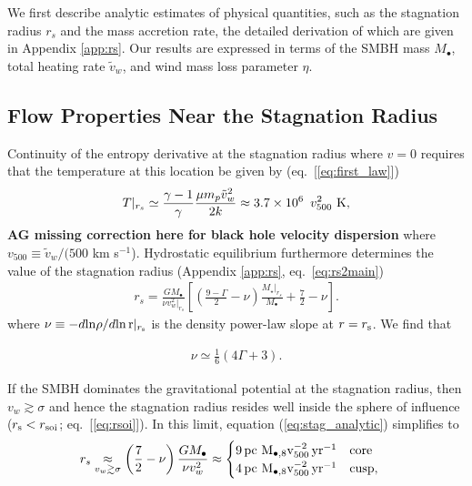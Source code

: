 \documentclass[usenatbib,fleqn]{mn2e}
\newcommand{\rs}{r_s}
\newcommand{\pc}{\rm pc}
\newcommand{\Mstar}{M_{\star}}
\newcommand{\Mbh}[1][]{M_{\bullet#1}}
\newcommand{\Mbheight}{M_{\bullet,8}}
\newcommand{\pyear}{{\rm yr}^{-1}}
\newcommand{\densSlope}{\nu}
\begin{document}
We first describe analytic estimates of physical quantities, such as the stagnation radius $\rs$ and the mass accretion rate, the detailed derivation of which are given in Appendix \ref{app:rs}.  Our results are expressed in terms of the SMBH mass $M_{\bullet}$, total heating rate $\tilde{v}_{w}$, and wind mass loss parameter $\eta$.

\subsection{Flow Properties Near the Stagnation Radius}

Continuity of the entropy derivative at the stagnation radius where $v = 0$ requires that the temperature at this location be given by (eq.~[\ref{eq:first_law}])
\begin{align}
T|_{r_{s}} \simeq \frac{\gamma-1}{\gamma}\frac{\mu m_p \tilde{v}_{w}^{2}}{2k} \approx 3.7
\times 10^6\ \, v_{500}^2 \,\,{\rm K},
\label{eq:Tanalytic}
\end{align}
{\bf AG missing correction here for black hole velocity dispersion}
where $v_{500} \equiv \tilde{v}_{w}/(500$ km s$^{-1}$).  Hydrostatic equilibrium furthermore determines the value of the stagnation radius (Appendix \ref{app:rs}, eq.~\ref{eq:rs2main})
\begin{align}
  \rs=\frac{G \Mbh}{\densSlope
    v_w^{2}|_{\rs}}\left[\left(\frac{9-\Gamma}{2} -\densSlope\right)
    \frac{\Mstar|_{\rs}}{\Mbh} +\frac{7}{2}-\densSlope\right].
\label{eq:stag_analytic}
\end{align}
where $\densSlope \equiv -d{\rm ln}\rho/d{\rm ln\,r}|_{r_{\rm s}}$ is the
density power-law slope at $r = r_{\rm s}$. We find that 

\begin{align}
\densSlope \simeq \frac{1}{6} \left(4 \Gamma+3\right).
\label{eq:densSlope}
\end{align}

If the SMBH dominates the gravitational potential at the stagnation
radius, then $v_{w} \gtrsim \sigma$ and hence the stagnation radius
resides well inside the sphere of influence ($r_{\rm s} < r_{\rm
  soi}$; eq.~[\ref{eq:rsoi}]).  In this limit, equation
(\ref{eq:stag_analytic}) simplifies to
\begin{eqnarray}
  &\rs \underset{v_w \gtrsim \sigma}\approx \left(\frac{7}{2}-\densSlope\right)\frac{G \Mbh}{\densSlope v_w^2} \approx \begin{cases}
    9
 \, \pc \,\, \Mbheight v_{500}^{-2}\, \pyear& \text{core} \\
    4
 \, \pc \,\, \Mbheight v_{500}^{-2} \, \pyear  & \text{cusp}, 
  \end{cases}
  \label{eq:stag_simple}
\end{eqnarray}
\end{document}
